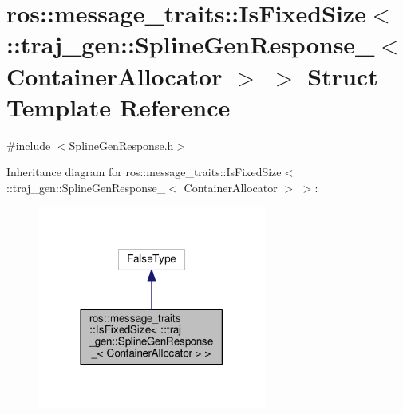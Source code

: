 \hypertarget{structros_1_1message__traits_1_1_is_fixed_size_3_01_1_1traj__gen_1_1_spline_gen_response___3_01_container_allocator_01_4_01_4}{}\section{ros\+:\+:message\+\_\+traits\+:\+:Is\+Fixed\+Size$<$ \+:\+:traj\+\_\+gen\+:\+:Spline\+Gen\+Response\+\_\+$<$ Container\+Allocator $>$ $>$ Struct Template Reference}
\label{structros_1_1message__traits_1_1_is_fixed_size_3_01_1_1traj__gen_1_1_spline_gen_response___3_01_container_allocator_01_4_01_4}


{\ttfamily \#include $<$Spline\+Gen\+Response.\+h$>$}



Inheritance diagram for ros\+:\+:message\+\_\+traits\+:\+:Is\+Fixed\+Size$<$ \+:\+:traj\+\_\+gen\+:\+:Spline\+Gen\+Response\+\_\+$<$ Container\+Allocator $>$ $>$\+:
\nopagebreak
\begin{figure}[H]
\begin{center}
\leavevmode
\includegraphics[width=213pt]{structros_1_1message__traits_1_1_is_fixed_size_3_01_1_1traj__gen_1_1_spline_gen_response___3_01_9973154c99bc97e2826b3b97addf2cad}
\end{center}
\end{figure}


